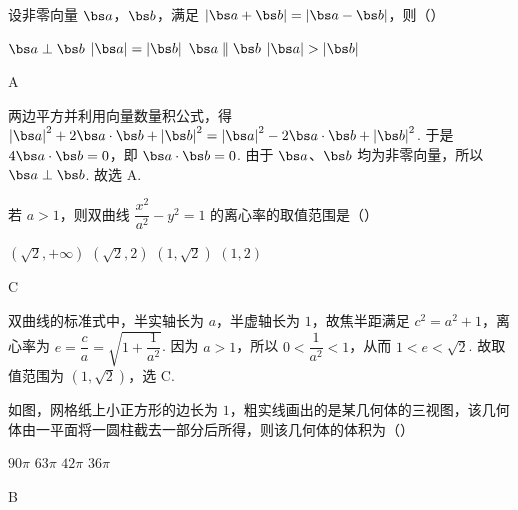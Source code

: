 \begin{problem}
设非零向量 \(\bs a\)，\(\bs b\)，满足 \(\left|\bs a+\bs b\right|=\left|\bs a-\bs b\right|\)，则（\quad）

\choices
    {\(\bs a\perp \bs b\)}
    {\(\left|\bs a\right|=\left|\bs b\right|\)}
    {\(\bs a\parallel\bs b\)}
    {\(\left|\bs a\right|>\left|\bs b\right|\)}
\end{problem}

\begin{answer}
A
\end{answer}

\begin{solution}
两边平方并利用向量数量积公式，得
\(\left|\bs a\right|^2+2\bs a\cdot\bs b+\left|\bs b\right|^2=\left|\bs a\right|^2-2\bs a\cdot\bs b+\left|\bs b\right|^2\).
于是 \(4\bs a\cdot\bs b=0\)，即 \(\bs a\cdot\bs b=0\).
由于 \(\bs a\)、\(\bs b\) 均为非零向量，所以 \(\bs a\perp\bs b\). 故选 A.
\end{solution}

\begin{problem}
若 \(a>1\)，则双曲线 \(\dfrac{x^2}{a^2}-y^2=1\) 的离心率的取值范围是（\quad）

\choices
    {\((\sqrt2,+\infty)\)}
    {\((\sqrt2,2)\)}
    {\((1,\sqrt2)\)}
    {\((1,2)\)}
\end{problem}

\begin{answer}
C
\end{answer}

\begin{solution}
双曲线的标准式中，半实轴长为 \(a\)，半虚轴长为 \(1\)，故焦半距满足
\(c^2=a^2+1\)，离心率为
\(e=\dfrac ca=\sqrt{1+\dfrac1{a^2}}\).
因为 \(a>1\)，所以 \(0<\dfrac1{a^2}<1\)，从而 \(1<e<\sqrt2\).
故取值范围为 \((1,\sqrt2)\)，选 C.
\end{solution}

\begin{problem}
如图，网格纸上小正方形的边长为 \(1\)，粗实线画出的是某几何体的三视图，该几何体由一平面将一圆柱截去一部分后所得，则该几何体的体积为（\quad）

\FloatBarrier

\choices
    {\(90\pi\)}
    {\(63\pi\)}
    {\(42\pi\)}
    {\(36\pi\)}
\end{problem}

\begin{answer}
B
\end{answer}

